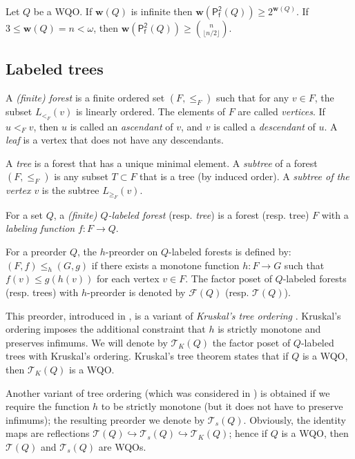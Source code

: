 \documentclass[runningheads]{llncs}
\let \leq \leqslant
\let \geq \geqslant
\let \embeds \hookrightarrow
\renewcommand \S [1][]{\mathsf{P_f^{#1}}}
\def \T {\mathcal{T}}
\def \F {\mathcal{F}}
\def \w {\textbf{w}}
\begin{document}
\begin{lemma}\label{w(S2)}
    Let $Q$ be a WQO. If $\w(Q)$ is infinite then $\w(\S[2](Q)) \geq 2^{\w(Q)}$. If $3 \leq \w(Q) = n < \omega$, then $\w(\S[2](Q)) \geq \binom{n}{\lfloor n/2 \rfloor}$.
\end{lemma}

\subsection{Labeled trees}\label{trees}

A \textit{(finite) forest} is a finite ordered set $(F, \leq_F)$ such that for any $v \in F$, the subset $L_{<_F}(v)$ is linearly ordered. The elements of $F$ are called \textit{vertices}. If $u <_F v$, then $u$ is called an \textit{ascendant} of $v$, and $v$ is called a \textit{descendant} of $u$. A \textit{leaf} is a vertex that does not have any descendants.

A \textit{tree} is a forest that has a unique minimal element. A \textit{subtree} of a forest $(F, \leq_F)$ is any subset $T \subset F$ that is a tree (by induced order). A \textit{subtree of the vertex $v$} is the subtree $L_{\geq_F}(v)$.

For a set $Q$, a \textit{(finite) $Q$-labeled forest} (resp. \textit{tree}) is a forest (resp. tree) $F$ with a \textit{labeling function} $f \colon F \to Q$.

\begin{definition}
    For a preorder $Q$, the $h$-preorder on $Q$-labeled forests is defined by: $(F, f) \leq_h (G, g)$ if there exists a monotone function $h \colon F \to G$ such that $f(v) \leq g(h(v))$ for each vertex $v \in F$. The factor poset of $Q$-labeled forests (resp. trees) with $h$-preorder is denoted by $\F(Q)$ (resp. $\T(Q)$).
\end{definition}

This preorder, introduced in \cite{Selivanov2011}, is a variant of \textit{Kruskal's tree ordering} \cite{Kruskal1960}. Kruskal's ordering imposes the additional constraint that $h$ is strictly monotone and preserves infimums. We will denote by $\T_K(Q)$ the factor poset of $Q$-labeled trees with Kruskal's ordering. Kruskal's tree theorem states that if $Q$ is a WQO, then $\T_K(Q)$ is a WQO.

Another variant of tree ordering (which was considered in \cite{Montalban2017,Friedman2023}) is obtained if we require the function $h$ to be strictly monotone (but it does not have to preserve infimums); the resulting preorder we denote by $\T_s(Q)$. Obviously, the identity maps are reflections $\T(Q) \embeds \T_s(Q) \embeds \T_K(Q)$; hence if $Q$ is a WQO, then $\T(Q)$ and $\T_s(Q)$ are WQOs.
\end{document}
